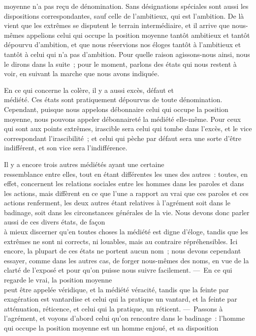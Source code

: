 \documentclass[french,twoside]{book} %
\begin{document}
moyenne n’a pas reçu de dénomination. Sans désignations spéciales sont aussi les dispositions correspondantes, sauf celle de l’ambitieux, qui est l’ambition. De là vient que les extrêmes se disputent le terrain intermédiaire, et il arrive que nous-mêmes appelions celui qui occupe la position moyenne tantôt ambitieux  et tantôt dépourvu d’ambition, et que nous réservions nos éloges tantôt à l’ambitieux et tantôt à celui qui n’a pas d’ambition. Pour quelle raison agissons-nous ainsi, nous le dirons dans la suite ; pour le moment, parlons des états qui nous restent à voir, en suivant la marche que nous avons indiquée.\par
En ce qui concerne la colère, il y a aussi excès, défaut et \\
médiété. Ces états sont pratiquement dépourvus de toute dénomination. Cependant, puisque nous appelons débonnaire celui qui occupe la position moyenne, nous pouvons appeler débonnaireté la médiété elle-même. Pour ceux qui sont aux points extrêmes, irascible sera celui qui tombe dans l’excès, et le vice correspondant l’irascibilité ; et celui qui pèche par défaut sera une sorte d’être indifférent, et son vice sera l’indifférence.\par
Il y a encore trois autres médiétés ayant une certaine \\
ressemblance entre elles, tout en étant différentes les unes des autres : toutes, en effet, concernent les relations sociales entre les hommes dans les paroles et dans les actions, mais diffèrent en ce que l’une a rapport au vrai que ces paroles et ces actions renferment, les deux autres étant relatives à l’agrément soit dans le badinage, soit dans les circonstances générales de la vie. Nous devons donc parler aussi de ces divers états, de façon \\
à mieux discerner qu’en toutes choses la médiété est digne d’éloge, tandis que les extrêmes ne sont ni corrects, ni louables, mais au contraire répréhensibles. Ici encore, la plupart de ces états ne portent aucun nom ; nous devons cependant essayer, comme dans les autres cas, de forger nous-mêmes des noms, en vue de la clarté de l’exposé et pour qu’on puisse nous suivre facilement. — En ce qui regarde le vrai, la position moyenne \\
peut être appelée véridique, et la médiété véracité, tandis que la feinte par exagération est vantardise et celui qui la pratique un vantard, et la feinte par atténuation, réticence, et celui qui la pratique, un réticent. — Passons à l’agrément, et voyons d’abord celui qu’on rencontre dans le badinage : l’homme qui occupe la position moyenne est un homme enjoué, et sa disposition \\
\end{document}
